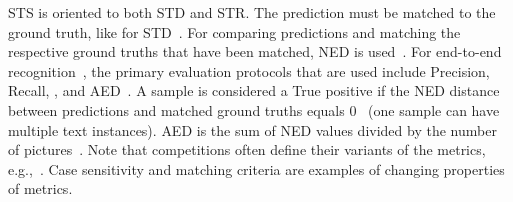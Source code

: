 \ac{STS} is oriented to both \ac{STD} and \ac{STR}.
The prediction must be matched to the ground truth, like for \ac{STD}~\citep{long_scene_2021}.
For comparing predictions and matching the respective ground truths that have been matched, \ac{NED}
is used~\citep{chen_text_2021}.
For end-to-end recognition~\citep{karatzas_icdar_2013,karatzas_icdar_2015}, the primary evaluation
protocols that are used include Precision, Recall, \fone, and \ac{AED}~\citep{chen_text_2021}.
A sample is considered a True positive if the \ac{NED} distance between predictions and
matched ground truths equals 0~\citep{sun_icdar_2019} (one sample can have multiple text
instances).
\ac{AED} is the sum of \ac{NED} values divided by the number of pictures~\citep{chen_text_2021}.
Note that competitions often define their variants of the metrics,
e.g.,~\cite{he_icpr2018_2018,shi_icdar2017_2017}.
Case sensitivity and matching criteria are examples of changing properties of metrics.

